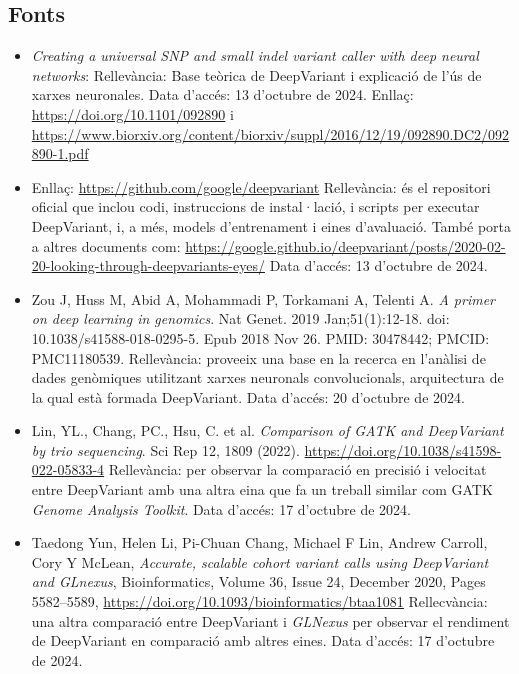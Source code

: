 \documentclass[a4paper]{article}
\begin{document}
	
	
	\subsection{Fonts}
	\begin{itemize}
		\item \emph{Creating a universal SNP and small indel variant caller with deep neural networks}:
		Rellevància: Base teòrica de DeepVariant i explicació de l'ús de xarxes neuronales.
		Data d'accés: 13 d'octubre de 2024.
		Enllaç: \url{https://doi.org/10.1101/092890}
		i \url{https://www.biorxiv.org/content/biorxiv/suppl/2016/12/19/092890.DC2/092890-1.pdf}
		\item Enllaç: \url{https://github.com/google/deepvariant} Rellevància: és el repositori oficial que inclou codi, instruccions de instal·lació, i scripts per executar DeepVariant, i, a més, models d'entrenament i eines d'avaluació. També porta a altres documents com: \url{https://google.github.io/deepvariant/posts/2020-02-20-looking-through-deepvariants-eyes/} Data d'accés: 13 d'octubre de 2024.
		\item Zou J, Huss M, Abid A, Mohammadi P, Torkamani A, Telenti A. \emph{A primer on deep learning in genomics}. Nat Genet. 2019 Jan;51(1):12-18. doi: 10.1038/s41588-018-0295-5. Epub 2018 Nov 26. PMID: 30478442; PMCID: PMC11180539. Rellevància: proveeix una base en la recerca en l'anàlisi de dades genòmiques utilitzant xarxes neuronals convolucionals, arquitectura de la qual està formada DeepVariant. Data d'accés: 20 d'octubre de 2024.
		\item Lin, YL., Chang, PC., Hsu, C. et al. \textit{Comparison of GATK and DeepVariant by trio sequencing}. Sci Rep 12, 1809 (2022). \url{https://doi.org/10.1038/s41598-022-05833-4} Rellevància: per observar la comparació en precisió i velocitat entre DeepVariant amb una altra eina que fa un treball similar com GATK \textit{Genome Analysis Toolkit}. Data d'accés: 17 d'octubre de 2024.
		\item Taedong Yun, Helen Li, Pi-Chuan Chang, Michael F Lin, Andrew Carroll, Cory Y McLean, \textit{Accurate, scalable cohort variant calls using DeepVariant and GLnexus}, Bioinformatics, Volume 36, Issue 24, December 2020, Pages 5582–5589, \url{https://doi.org/10.1093/bioinformatics/btaa1081} Rellecvància: una altra comparació entre DeepVariant i \textit{GLNexus} per observar el rendiment de DeepVariant en comparació amb altres eines. Data d'accés: 17 d'octubre de 2024.
	\end{itemize}
		
\end{document}
